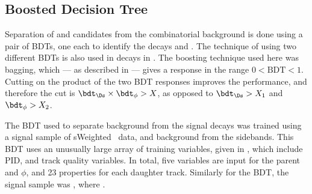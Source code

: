 \subsection{Boosted Decision Tree}
Separation of \Ds and \phii candidates from the combinatorial background is done using a pair of
BDTs, one each to identify the decays \decay{\Ds}{\kkpi} and \decay{\phi}{\kk}.
The technique of using two different BDTs is also used in  decays in
.
The boosting technique used here was bagging, which --- as described in  --- gives
a response in the range $0<\mathrm{BDT}<1$.
Cutting on the product of the two BDT responses improves the performance, and therefore the cut is
$\bdt_{\Ds}\times\bdt_\phi>X$, as opposed to $\bdt_{\Ds}>X_1$ and $\bdt_\phi>X_2$.

The BDT used to separate background from the signal \decay{\Ds}{\kkpi} decays was trained using
a signal sample of \decay{\Bs}{\Dsm\pip} sWeighted~\cite{splot} data, and background from the \Dsm
sidebands.
This BDT uses an unusually large array of training variables, given in ,
which include PID, and track quality variables.
In total, five variables are input for the parent \Ds and $\phi$, and 23 properties for each
daughter track.
Similarly for the \decay{\phi}{\kk} BDT, the signal sample was \decay{\Bs}{\jpsi\phi}, where
\jpsitomumu.


